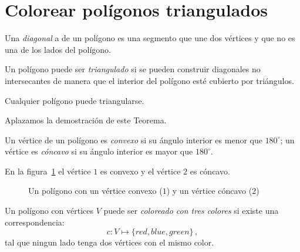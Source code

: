 \section{Colorear polígonos triangulados}\label{s.museum-triangulating}

\begin{definition}
Una \emph{diagonal} a de un polígono es una segmento que une dos vértices y que no es una de los lados del polígono.
\end{definition}

\begin{definition}
Un polígono puede ser \emph{triangulado} si se pueden construir diagonales no intersecantes de manera que el interior del polígono esté cubierto por triángulos.
\end{definition}

\begin{theorem}
Cualquier polígono puede triangularse.\label{thm.tri}
\end{theorem}
Aplazamos la demostración de este Teorema.
\begin{definition}
Un vértice de un polígono es \emph{convexo} si su ángulo interior es menor que $180^\circ$; un vértice es \emph{cóncavo} si su ángulo interior es mayor que $180^\circ$. 
\end{definition}
En la figura~\ref{f.museum.arbitrary} el vértice $1$ es convexo y el vértice $2$ es cóncavo.

\begin{figure}[ht]
\begin{center}
\end{center}
\caption{Un polígono con un vértice convexo ($1$) y un vértice cóncavo ($2$)}\label{f.museum.arbitrary}
\end{figure}

\begin{definition}
Un polígono con vértices $V$ puede ser \emph{coloreado con tres colores} si existe una correspondencia:
\[c: V \mapsto \{\mathit{red},\mathit{blue},\mathit{green}\}\,,\]
tal que ningun lado tenga dos vértices con el mismo color.
\end{definition}

